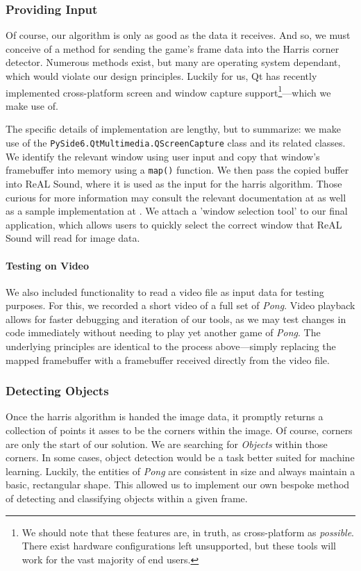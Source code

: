 \documentclass{report}
\newcommand{\rs}{ReAL Sound\xspace}
\begin{document}
\subsubsection{Providing Input}
Of course, our algorithm is only as good as the data it receives. And so, we must conceive of a method for sending the game's frame data into the Harris corner detector. Numerous methods exist, but many are operating system dependant, which would violate our design principles. Luckily for us, Qt has recently implemented cross-platform screen and window capture support\footnote{We should note that these features are, in truth, as cross-platform as \emph{possible}. There exist hardware configurations left unsupported, but these tools will work for the vast majority of end users.}---which we make use of.
 
The specific details of implementation are lengthy, but to summarize: we make use of the \texttt{PySide6.QtMultimedia.QScreenCapture} class and its related classes. We identify the relevant window using user input and copy that window's framebuffer into memory using a \texttt{map()} function. We then pass the copied buffer into \rs, where it is used as the input for the harris algorithm.  Those curious for more information may consult the relevant documentation at \cite{QT_Doc} as well as a sample implementation at \cite{QT_EX}. We attach a 'window selection tool' to our final application, which allows users to quickly select the correct window that \rs will read for image data. 

\paragraph{Testing on Video} 
We also included functionality to read a video file as input data for testing purposes. For this, we recorded a short video of a full set of \emph{Pong}. Video playback allows for faster debugging and iteration of our tools, as we may test changes in code immediately without needing to play yet another game of \emph{Pong}. The underlying principles are identical to the process above---simply replacing the mapped framebuffer with a framebuffer received directly from the video file.

\subsubsection{Detecting Objects}
Once the harris algorithm is handed the image data, it promptly returns a collection of points it asses to be the corners within the image. Of course, corners are only the start of our solution. We are searching for \emph{Objects} within those corners. In some cases, object detection would be a task better suited for machine learning. Luckily, the entities of \emph{Pong} are consistent in size and always maintain a basic, rectangular shape. This allowed us to implement our own bespoke method of detecting and classifying objects within a given frame.
\end{document}
